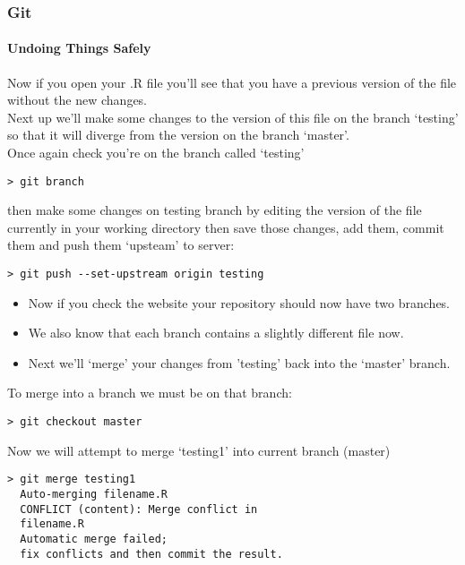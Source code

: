 \documentclass[xcolor=dvipsnames]{beamer}
\begin{document}
\begin{frame}[fragile]
\frametitle{Git}
\framesubtitle{Undoing Things Safely}
Now if you open your .R file you'll see that you have a previous version of the file without the new changes.\\
Next up we'll make some changes to the version of this file on the branch `testing' so that it will diverge from the version on the branch `master'.\\
Once again check you're on the branch called `testing'
\begin{block}{}
\begin{lstlisting}
> git branch
\end{lstlisting}
\end{block}
then make some changes on testing branch by editing the version of the file currently in your working directory then save those changes, add them, commit them and push them `upsteam' to server:
\begin{block}{}
\begin{lstlisting}
> git push --set-upstream origin testing
\end{lstlisting}
\end{block}

\end{frame}

\begin{frame}[fragile]
\begin{itemize}
\item Now if you check the website your repository should now have two branches.
\newline
\newline
\item We also know that each branch contains a slightly different file now.
\newline
\newline
\item Next we'll `merge' your changes from 'testing' back into the `master' branch.
\end{itemize}
\end{frame}


\begin{frame}[fragile]
To merge into a branch we must be on that branch:\\
\begin{block}{}
\begin{lstlisting}
> git checkout master
\end{lstlisting}
\end{block}

Now we will attempt to merge `testing1' into current branch (master)
\begin{block}{}
\begin{lstlisting}
> git merge testing1
  Auto-merging filename.R
  CONFLICT (content): Merge conflict in 
  filename.R
  Automatic merge failed; 
  fix conflicts and then commit the result.
\end{lstlisting}
\end{block}
\end{frame}
\end{document}
